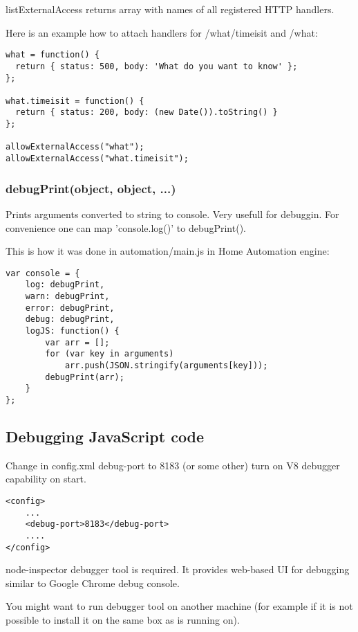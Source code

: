 listExternalAccess returns array with names of all registered HTTP handlers.

Here is an example how to attach handlers for /what/timeisit and /what:

\begin{lstlisting}[basicstyle=\small,columns=fullflexible]
what = function() {
  return { status: 500, body: 'What do you want to know' };
};

what.timeisit = function() {
  return { status: 200, body: (new Date()).toString() }
};

allowExternalAccess("what");
allowExternalAccess("what.timeisit");
\end{lstlisting}

\subsubsection{debugPrint(object, object, ...)}

Prints arguments converted to string to \zway console. Very usefull for debuggin.
For convenience one can map 'console.log()' to debugPrint().

This is how it was done in automation/main.js in \zway Home Automation engine:
\begin{lstlisting}[basicstyle=\small,columns=fullflexible]
var console = {
    log: debugPrint,
    warn: debugPrint,
    error: debugPrint,
    debug: debugPrint,
    logJS: function() {
        var arr = [];
        for (var key in arguments)
            arr.push(JSON.stringify(arguments[key]));
        debugPrint(arr);
    }
};
\end{lstlisting}

\subsection{Debugging JavaScript code}
Change in config.xml debug-port to 8183 (or some other) turn on V8 debugger capability on \zway start.

\begin{lstlisting}[basicstyle=\small,columns=fullflexible]
<config>
    ...
    <debug-port>8183</debug-port>
    ....
</config>
\end{lstlisting}

node-inspector debugger tool is required. It provides web-based UI for debugging similar 
to Google Chrome debug console.

You might want to run debugger tool on another machine (for example if it is not possible to 
install it on the same box as \zway is running on).

